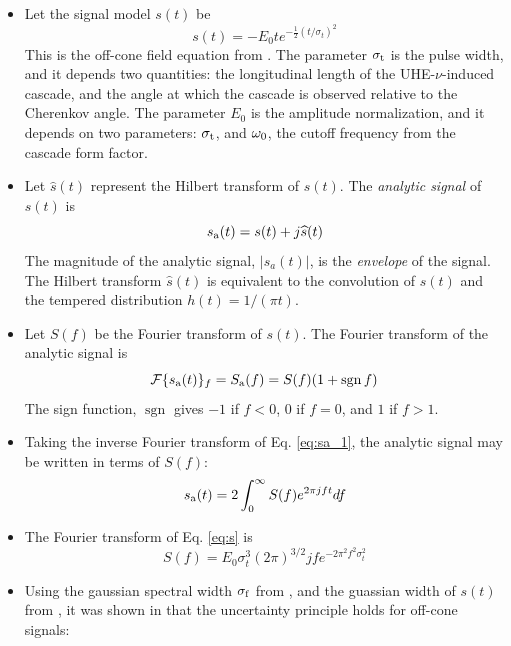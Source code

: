 \documentclass[amsmath,amssymb,aps,prd,10pt,twocolumn,showkeys]{revtex4}
\DeclareMathOperator{\sgn}{sgn}
\begin{document}
\begin{itemize}
\item Let the signal model $s(t)$ be
\begin{equation}
s(t) = -E_0 t e^{-\frac{1}{2}\left(t/\sigma_t\right)^2} \label{eq:s}
\end{equation}
This is the off-cone field equation from \cite{PhysRevD.105.123019}.  The parameter $\sigma_{\rm t}$ is the pulse width, and it depends two quantities: the longitudinal length of the UHE-$\nu$-induced cascade, and the angle at which the cascade is observed relative to the Cherenkov angle.  The parameter $E_0$ is the amplitude normalization, and it depends on two parameters: $\sigma_{\rm t}$, and $\omega_{\rm 0}$, the cutoff frequency from the cascade form factor.
\item Let $\widehat{s}(t)$ represent the Hilbert transform of $s(t)$.  The \textit{analytic signal} of $s(t)$ is
\begin{equation}
s_{\rm a}(t) = s(t) + j \widehat{s}(t)
\end{equation}
The magnitude of the analytic signal, $|s_a(t)|$, is the \textit{envelope} of the signal.  The Hilbert transform $\widehat{s}(t)$ is equivalent to the convolution of $s(t)$ and the tempered distribution $h(t) = 1/(\pi t)$.
\item Let $S(f)$ be the Fourier transform of $s(t)$.  The Fourier transform of the analytic signal is
\begin{equation}
\mathcal{F}\lbrace s_{\rm a}(t) \rbrace_{f} = S_{\rm a}(f) = S(f)(1+\sgn{f}) \label{eq:sa_1}
\end{equation}
The sign function, $\sgn$ gives $-1$ if $f<0$, $0$ if $f=0$, and $1$ if $f>1$.
\item Taking the inverse Fourier transform of Eq. \ref{eq:sa_1}, the analytic signal may be written in terms of $S(f)$:
\begin{equation}
s_{\rm a}(t) = 2\int_{0}^{\infty} S(f) e^{2\pi j f t} df \label{eq:sa_2}
\end{equation}
\item The Fourier transform of Eq. \ref{eq:s} is
\begin{equation}
S(f) = E_0 \sigma_t^3 (2\pi)^{3/2} j f e^{-2\pi^2 f^2 \sigma_t^2}
\end{equation}
\item Using the gaussian spectral width $\sigma_{\rm f}$ from \cite{10.1016/j.astropartphys.2017.03.008}, and the guassian width of $s(t)$ from \cite{PhysRevD.105.123019}, it was shown in \cite{PhysRevD.105.123019} that the uncertainty principle holds for off-cone signals:

\end{itemize}
\end{document}
